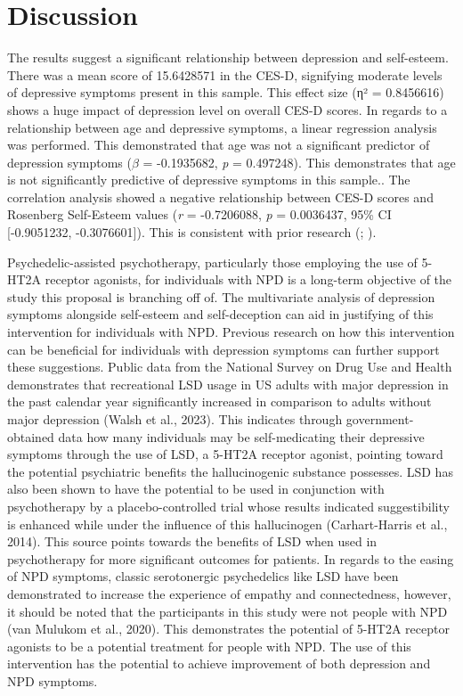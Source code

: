 \documentclass[
  man,
  floatsintext,
  longtable,
  nolmodern,
  notxfonts,
  notimes,
  colorlinks=true,linkcolor=blue,citecolor=blue,urlcolor=blue]{apa7}
\begin{document}
\section{Discussion}\label{discussion}

The results suggest a significant relationship between depression and
self-esteem. There was a mean score of 15.6428571 in the CES-D,
signifying moderate levels of depressive symptoms present in this
sample. This effect size (η² = 0.8456616) shows a huge impact of
depression level on overall CES-D scores. In regards to a relationship
between age and depressive symptoms, a linear regression analysis was
performed. This demonstrated that age was not a significant predictor of
depression symptoms (\(\beta\) = -0.1935682, \emph{p} = 0.497248). This
demonstrates that age is not significantly predictive of depressive
symptoms in this sample.. The correlation analysis showed a negative
relationship between CES-D scores and Rosenberg Self-Esteem values
(\emph{r} = -0.7206088, \emph{p} = 0.0036437, 95\% CI {[}-0.9051232,
-0.3076601{]}). This is consistent with prior research
(;
).

Psychedelic-assisted psychotherapy, particularly those employing the use
of 5-HT2A receptor agonists, for individuals with NPD is a long-term
objective of the study this proposal is branching off of. The
multivariate analysis of depression symptoms alongside self-esteem and
self-deception can aid in justifying of this intervention for
individuals with NPD. Previous research on how this intervention can be
beneficial for individuals with depression symptoms can further support
these suggestions. Public data from the National Survey on Drug Use and
Health demonstrates that recreational LSD usage in US adults with major
depression in the past calendar year significantly increased in
comparison to adults without major depression (Walsh et al., 2023). This
indicates through government-obtained data how many individuals may be
self-medicating their depressive symptoms through the use of LSD, a
5-HT2A receptor agonist, pointing toward the potential psychiatric
benefits the hallucinogenic substance possesses. LSD has also been shown
to have the potential to be used in conjunction with psychotherapy by a
placebo-controlled trial whose results indicated suggestibility is
enhanced while under the influence of this hallucinogen (Carhart-Harris
et al., 2014). This source points towards the benefits of LSD when used
in psychotherapy for more significant outcomes for patients. In regards
to the easing of NPD symptoms, classic serotonergic psychedelics like
LSD have been demonstrated to increase the experience of empathy and
connectedness, however, it should be noted that the participants in this
study were not people with NPD (van Mulukom et al., 2020). This
demonstrates the potential of 5-HT2A receptor agonists to be a potential
treatment for people with NPD. The use of this intervention has the
potential to achieve improvement of both depression and NPD symptoms.
\end{document}
